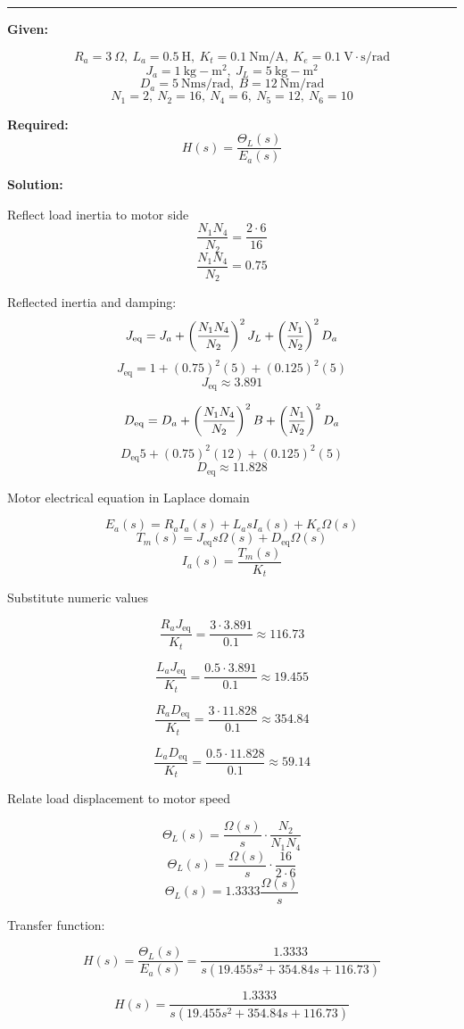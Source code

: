 \noindent\rule{\textwidth}{1pt}

\textbf{Given:}

\[
R_a = 3\ \Omega, \ L_a = 0.5\ \mathrm{H}, \ K_t = 0.1\ \mathrm{Nm/A}, \ K_e = 0.1\ \mathrm{V\cdot s/rad}
\]
\[
J_a = 1\ \mathrm{kg\!-\!m^2}, \ J_L = 5\ \mathrm{kg\!-\!m^2}
\]
\[
D_a = 5\ \mathrm{Nms/rad}, \ B = 12\ \mathrm{Nm/rad}
\]
\[
N_1 = 2, \ N_2 = 16, \ N_4 = 6, \ N_5 = 12, \ N_6 = 10
\]

\textbf{Required:}
\[
H(s) = \frac{\Theta_L(s)}{E_a(s)}
\]

\textbf{Solution:}

Reflect load inertia to motor side
\[
\frac{N_1 N_4}{N_2} = \frac{2 \cdot 6}{16} 
\]
\[
\frac{N_1 N_4}{N_2}= 0.75
\]

Reflected inertia and damping:
\[
J_\mathrm{eq} = J_a + \left(\frac{N_1 N_4}{N_2}\right)^2 J_L + \left(\frac{N_1}{N_2}\right)^2 D_a \\
\]
\[
J_\mathrm{eq}= 1 + (0.75)^2 (5) + (0.125)^2 (5) 
\]
\[
J_\mathrm{eq}\approx 3.891
\]

\[
D_\mathrm{eq} = D_a + \left(\frac{N_1 N_4}{N_2}\right)^2 B + \left(\frac{N_1}{N_2}\right)^2 D_a \\
\]
\[
D_\mathrm{eq} 5 + (0.75)^2 (12) + (0.125)^2 (5) 
\]
\[
D_\mathrm{eq} \approx 11.828
\]

Motor electrical equation in Laplace domain

\[
E_a(s) = R_a I_a(s) + L_a s I_a(s) + K_e \Omega(s)
\]
\[
T_m(s) = J_\mathrm{eq} s \Omega(s) + D_\mathrm{eq} \Omega(s)
\]
\[
I_a(s) = \frac{T_m(s)}{K_t}
\]

Substitute numeric values

\[
\frac{R_a J_\mathrm{eq}}{K_t} = \frac{3 \cdot 3.891}{0.1} \approx 116.73
\]

\[
\frac{L_a J_\mathrm{eq}}{K_t} = \frac{0.5 \cdot 3.891}{0.1} \approx 19.455
\]

\[
\frac{R_a D_\mathrm{eq}}{K_t} = \frac{3 \cdot 11.828}{0.1} \approx 354.84
\]

\[
\frac{L_a D_\mathrm{eq}}{K_t} = \frac{0.5 \cdot 11.828}{0.1} \approx 59.14
\]

Relate load displacement to motor speed

\[
\Theta_L(s) = \frac{\Omega(s)}{s} \cdot \frac{N_2}{N_1 N_4} 
\]
\[
\Theta_L(s)= \frac{\Omega(s)}{s} \cdot \frac{16}{2 \cdot 6} 
\]
\[
\Theta_L(s)= 1.3333 \frac{\Omega(s)}{s}
\]

Transfer function:

\[
H(s) = \frac{\Theta_L(s)}{E_a(s)} = \frac{1.3333}{s \left( 19.455 s^2 + 354.84 s + 116.73 \right)}
\]

\[
\boxed{H(s) = \frac{1.3333}{s \left( 19.455 s^2 + 354.84 s + 116.73 \right)}}
\]